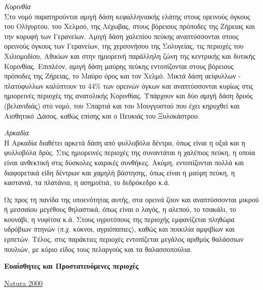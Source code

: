 \documentclass[12pt]{article}
\newcommand{\gr}{\selectlanguage{greek}}
\newcommand{\eng}{\selectlanguage{english}}
\begin{document}
		\emph{Κορινθία} \\
		Στο νομό παρατηρούνται αμιγή δάση κεφαλληνιακής ελάτης στους ορεινούς όγκους του Ολίγυρτου, του Χελμού, της Λέχωβας, στους βόρειους πρόποδες της Ζήρειας και την κορυφή των Γερανείων. Αμιγή δάση χαλεπίου πεύκης αναπτύσσονται στους ορεινούς όγκους των Γερανείων, της χερσονήσου της Σολυγείας, τις περιοχές του Χιλιομοδίου, Αθικίων και στην ημιορεινή παράλληλη ζώνη της κεντρικής και δυτικής Κορινθίας. Επιπλέον, αμιγή δάση μαύρης πεύκης εντοπίζονται στους βόρειους πρόποδες της Ζήρειας, το Μαύρο όρος και τον Χελμό. Μικτά δάση αείφυλλων - πλατύφυλλων καλύπτουν το 44\% των ορεινών όγκων και αναπτύσσονται κυρίως στις ημιορεινές περιοχές της ανατολικής Κορινθίας. Υπάρχουν και δύο αμιγή δάση δρυός (βελανιδιάς) στο νομό, του Σπαρτιά και του Μουγγοστού που έχει κηρυχθεί και Αισθητικό Δάσος, καθώς επίσης και ο Πευκιάς του Ξυλοκάστρου.
		
		\emph{Αρκαδία} \\
		Η Αρκαδία διαθέτει αρκετά δάση από φυλλοβόλα δέντρα, όπως είναι η οξιά και η φυλλοβόλα δρύς. Στις ημιορεινές περιοχές της συναντάται η χαλέπιος πεύκη, η οποία είναι ανθεκτική στις δύσκολες καιρικές συνθήκες. Ακόμη, εντοπίζονται πολλά και διαφορετικά είδη δέντρων και χαμηλή βάστησης, όπως  είναι η μαύρη πεύκη, η καστανιά, τα πλατάνια, η ασημοϊτιά, το δεδρόκεδρο κ.ά.
		
		Ως προς τη πανίδα της υποενότητας αυτής, στα ορεινά ζουν και αναπτύσσονται μικρού ή μεσσαίου μεγέθους θηλαστικά, όπως είναι ο λαγός, η αλεπού, το τσακάλι, το κουνάβι, η νυφίτσα κ.ά. Στους υγροτόπους της περιοχής εμφανίζεται πληθώρα υδρόβιων πτηνών (π.χ. κύκνοι, αγριόπαπιες), καθώς και ποικιλία αμφιβίων και ερπετών. Τέλος, στις παράκτιες περιοχές εντοπίζεται μεγάλος αριθμός θαλάσσιων πουλιών, με κύριο είδος τους πελαργούς και τα θαλασσοπούλια.

	\textbf{Ευαίσθητες και Προστατευόμενες περιοχές}
	
	\underline{\eng Natura 2000}\gr
	
\end{document}

